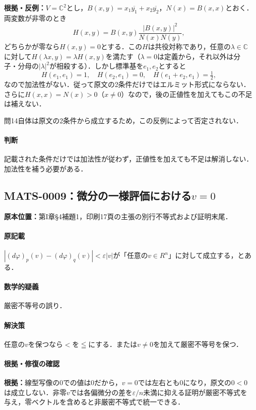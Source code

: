 \documentclass[a4paper,10pt]{ltjsarticle}
\begin{document}
\textbf{根拠・反例：}$V=\mathbb C^2$とし，$B(x,y)=x_1\overline{y_1}+x_2\overline{y_2}$，$N(x)=B(x,x)$とおく．両変数が非零のとき
\[
H(x,y)=B(x,y)\frac{|B(x,y)|^2}{N(x)N(y)},
\]
どちらかが零なら$H(x,y)=0$とする．この$H$は共役対称であり，任意の$\lambda\in\mathbb C$に対して$H(\lambda x,y)=\lambda H(x,y)$を満たす（$\lambda=0$は定義から，それ以外は分子・分母の$|\lambda|^2$が相殺する）．しかし標準基を$e_1,e_2$とすると
\[
H(e_1,e_1)=1,\quad H(e_2,e_1)=0,\quad H(e_1+e_2,e_1)=\tfrac12,
\]
なので加法性がない．従って原文の2条件だけではエルミット形式にならない．さらに$H(x,x)=N(x)>0$（$x\ne0$）なので，後の正値性を加えてもこの不足は補えない．

問14自体は原文の2条件から成立するため，この反例によって否定されない．

\paragraph{判断}記載された条件だけでは加法性が従わず，正値性を加えても不足は解消しない．加法性を補う必要がある．


\subsection*{MATS-0009：微分の一様評価における$v=0$}\label{math:MATS-0009}
\noindent\textbf{原本位置：}第I章\S4補題1，印刷17頁の主張の別行不等式および証明末尾．

\paragraph{原記載}$|(d\varphi)_p(v)-(d\varphi)_q(v)|<\varepsilon|v|$が「任意の$v\in R^n$」に対して成立する，とある．

\paragraph{数学的疑義}厳密不等号の誤り．

\paragraph{解決策}任意の$v$を保つなら$<$を$\leqq$にする．または$v\ne0$を加えて厳密不等号を保つ．

\paragraph{根拠・修復の確認}\textbf{根拠：}線型写像の$0$での値は$0$だから，$v=0$では左右とも$0$になり，原文の$0<0$は成立しない．非零$v$では各偏微分の差を$\varepsilon/n$未満に抑える証明が厳密不等式を与え，零ベクトルを含めると非厳密不等式で統一できる．
\end{document}
